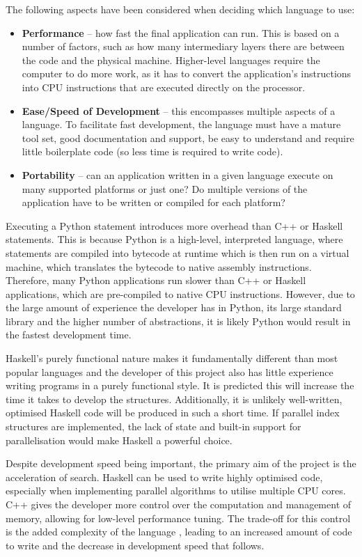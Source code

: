 The following aspects have been considered when deciding which language to use:
\begin{itemize}
	\item \textbf{Performance} -- how fast the final application can run. This is based on a number of factors, such as how many intermediary layers there are between the code and the physical machine. Higher-level languages require the computer to do more work, as it has to convert the application's instructions into CPU instructions that are executed directly on the processor.
	\item \textbf{Ease/Speed of Development} -- this encompasses multiple aspects of a language. To facilitate fast development, the language must have a mature tool set, good  documentation and support, be easy to understand and require little boilerplate code (so less time is required to write code).
	\item \textbf{Portability} -- can an application written in a given language execute on many supported platforms or just one? Do multiple versions of the application have to be written or compiled for each platform?
\end{itemize}
 
Executing a Python statement introduces more overhead than C++ or Haskell statements. This is because Python is a high-level, interpreted language, where statements are compiled into bytecode at runtime which is then run on a virtual machine, which translates the bytecode to native assembly instructions. Therefore, many Python applications run slower than C++ or Haskell applications, which are pre-compiled to native CPU instructions. However, due to the large amount of experience the developer has in Python, its large standard library and the higher number of abstractions, it is likely Python would result in the fastest development time. 

Haskell's purely functional nature makes it fundamentally different than most popular languages and the developer of this project also has little experience writing programs in a purely functional style. It is predicted this will increase the time it takes to develop the structures. Additionally, it is unlikely well-written, optimised Haskell code will be produced in such a short time. If parallel index structures are implemented, the lack of state and built-in support for parallelisation \cite{parallel-haskell} would make Haskell a powerful choice.

Despite development speed being important, the primary aim of the project is the acceleration of search. Haskell can be used to write highly optimised code, especially when implementing parallel algorithms to utilise multiple CPU cores. C++ gives the developer more control over the computation and management of memory, allowing for low-level performance tuning. The trade-off for this control is the added complexity of the language \cite{cpp-hard}, leading to an increased amount of code to write and the decrease in development speed that follows.


